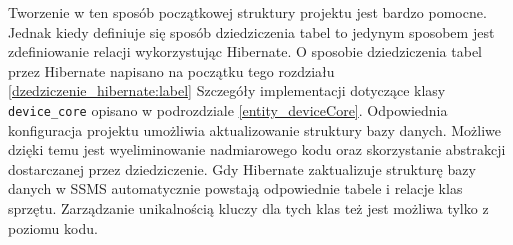 Tworzenie w ten sposób początkowej struktury projektu jest bardzo pomocne. Jednak kiedy definiuje się sposób dziedziczenia tabel to jedynym sposobem jest zdefiniowanie relacji wykorzystując Hibernate. O sposobie dziedziczenia tabel przez Hibernate napisano na początku tego rozdziału \ref{dzedziczenie_hibernate:label} Szczegóły implementacji dotyczące klasy \texttt{device\_core} opisano w podrozdziale \ref{entity_deviceCore}. Odpowiednia konfiguracja projektu umożliwia aktualizowanie struktury bazy danych. Możliwe dzięki temu jest wyeliminowanie nadmiarowego kodu oraz skorzystanie abstrakcji dostarczanej przez dziedziczenie. Gdy Hibernate zaktualizuje strukturę bazy danych w SSMS automatycznie powstają odpowiednie tabele i relacje klas sprzętu. Zarządzanie unikalnością kluczy dla tych klas też jest możliwa tylko z poziomu kodu.
 

